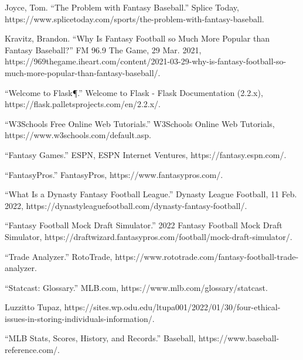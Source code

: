 \documentclass[10pt,twocolumn]{article}
\begin{document}
\begin{thebibliography}{12}

 Joyce, Tom. “The Problem with Fantasy Baseball.” Splice Today, https://www.splicetoday.com/sports/the-problem-with-fantasy-baseball. 

 Kravitz, Brandon. “Why Is Fantasy Football so Much More Popular than Fantasy Baseball?” FM 96.9 The Game, 29 Mar. 2021, https://969thegame.iheart.com/content/2021-03-29-why-is-fantasy-football-so-much-more-popular-than-fantasy-baseball/. 

 “Welcome to Flask¶.” Welcome to Flask - Flask Documentation (2.2.x), https://flask.palletsprojects.com/en/2.2.x/. 

 “W3Schools Free Online Web Tutorials.” W3Schools Online Web Tutorials, https://www.w3schools.com/default.asp. 

 “Fantasy Games.” ESPN, ESPN Internet Ventures, https://fantasy.espn.com/. 

 “FantasyPros.” FantasyPros, https://www.fantasypros.com/. 

 “What Is a Dynasty Fantasy Football League.” Dynasty League Football, 11 Feb. 2022, https://dynastyleaguefootball.com/dynasty-fantasy-football/. 

 “Fantasy Football Mock Draft Simulator.” 2022 Fantasy Football Mock Draft Simulator, https://draftwizard.fantasypros.com/football/mock-draft-simulator/. 

 “Trade Analyzer.” RotoTrade, https://www.rototrade.com/fantasy-football-trade-analyzer. 

 “Statcast: Glossary.” MLB.com, https://www.mlb.com/glossary/statcast. 

 Luzzitto Tupaz, https://sites.wp.odu.edu/ltupa001/2022/01/30/four-ethical-issues-in-storing-individuals-information/. 

 “MLB Stats, Scores, History, and Records.” Baseball, https://www.baseball-reference.com/. 

\end{thebibliography}
\end{document}

